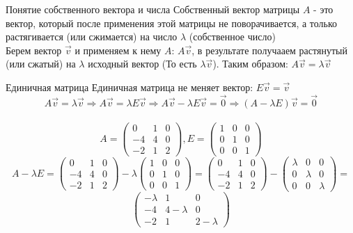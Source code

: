 
\begin{frame}{Понятие собственного вектора и числа}
Собственный вектор матрицы $A$ - это вектор, который после применения этой матрицы не поворачивается, а только растягивается (или сжимается) на число $\lambda$ (собственное число) \\

Берем вектор $\vec{v}$ и применяем к нему $A$: $A\vec{v}$, в результате получааем растянутый (или сжатый) на $\lambda$ исходный вектор (То есть $\lambda\vec{v}$). Таким образом:  $A\vec{v} = \lambda\vec{v}$
\end{frame}


\begin{frame}{Единичная матрица}
Единичная матрица не меняет вектор: $E\vec{v} = \vec{v}$ \\
$$ A\vec{v} = \lambda\vec{v} \Rightarrow  A\vec{v} = \lambda E\vec{v} \Rightarrow A\vec{v} - \lambda E\vec{v} = \vec{0} \Rightarrow (A - \lambda E)\vec{v} = \vec{0} $$ \\
\[
A=\left(\begin{array}{lll}
    0 & 1 & 0 \\
    -4 & 4 & 0 \\
    -2 & 1 & 2
    \end{array}\right),
E=\left(\begin{array}{lll}
    1 & 0 & 0 \\
    0 & 1 & 0 \\
    0 & 0 & 1
    \end{array}\right) 
\]
\[
A - \lambda E =\left(\begin{array}{lll}
    0 & 1 & 0 \\
    -4 & 4 & 0 \\
    -2 & 1 & 2
    \end{array}\right) -
\lambda \left(\begin{array}{lll}
    1 & 0 & 0 \\
    0 & 1 & 0 \\
    0 & 0 & 1
    \end{array}\right) =
\left(\begin{array}{lll}
    0 & 1 & 0 \\
    -4 & 4 & 0 \\
    -2 & 1 & 2
    \end{array}\right) -
\left(\begin{array}{lll}
    \lambda & 0 & 0 \\
    0 & \lambda & 0 \\
    0 & 0 & \lambda
    \end{array}\right) =
\]
\[
\left(\begin{array}{lll}
    -\lambda & 1 & 0 \\
    -4 & 4 - \lambda & 0 \\
    -2 & 1 & 2 - \lambda
    \end{array}\right)   
\]
\end{frame}

